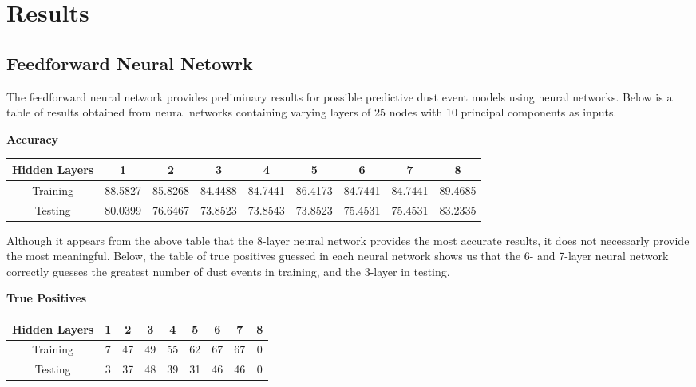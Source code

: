 \documentclass{article}
\begin{document}
\section{Results}
\subsection{Feedforward Neural Netowrk}
The feedforward neural network provides preliminary results for possible predictive dust event models using neural networks. Below is a table of results obtained from neural networks containing varying layers of 25 nodes with 10 principal components as inputs.
\begin{center}
	\textbf{Accuracy} \\
	\begin{tabular}{ |c|c|c|c|c|c|c|c|c| }
		\hline
		Hidden Layers & 1 & 2 & 3 & 4 & 5 & 6 & 7 & 8\\
		\hline
		Training & 88.5827 & 85.8268 & 84.4488 & 84.7441 & 86.4173 & 84.7441 & 84.7441 & 89.4685 \\
		\hline
		Testing & 80.0399 & 76.6467 & 73.8523 & 73.8543 & 73.8523 & 75.4531 & 75.4531 & 83.2335\\
		\hline
	\end{tabular}
\end{center}

Although it appears from the above table that the 8-layer neural network provides the most accurate results, it does not necessarly provide the most meaningful. Below, the table of true positives guessed in each neural network shows us that the 6- and 7-layer neural network correctly guesses the greatest number of dust events in training, and the 3-layer in testing.
\begin{center}
	\textbf{True Positives}
	\\
	\begin{tabular}{ |c|c|c|c|c|c|c|c|c| }
		\hline
		Hidden Layers & 1 & 2 & 3 & 4 & 5 & 6 & 7 & 8\\
		\hline
		Training & 7 & 47 & 49 & 55 & 62 & 67 & 67 & 0\\
		\hline
		Testing & 3 & 37 & 48 & 39 & 31 & 46 & 46 & 0\\
		\hline

	\end{tabular}
\end{center}
\end{document}
